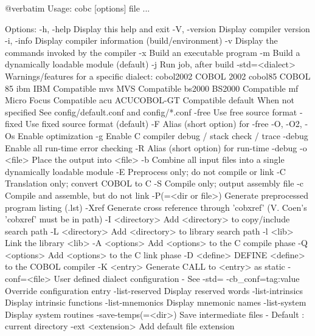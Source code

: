 @verbatim
Usage: cobc [options] file ...

Options:
  -h, -help             Display this help and exit
  -V, -version          Display compiler version
  -i, -info             Display compiler information (build/environment)
  -v                    Display the commands invoked by the compiler
  -x                    Build an executable program
  -m                    Build a dynamically loadable module (default)
  -j                    Run job, after build
  -std=<dialect>        Warnings/features for a specific dialect:
                          cobol2002   COBOL 2002
                          cobol85     COBOL 85
                          ibm         IBM Compatible
                          mvs         MVS Compatible
                          bs2000      BS2000 Compatible
                          mf          Micro Focus Compatible
                          acu         ACUCOBOL-GT Compatible
                          default     When not specified
                        See config/default.conf and config/*.conf
  -free                 Use free source format
  -fixed                Use fixed source format (default)
  -F                    Alias (short option) for -free
  -O, -O2, -Os          Enable optimization
  -g                    Enable C compiler debug / stack check / trace
  -debug                Enable all run-time error checking
  -R                    Alias (short option) for run-time -debug
  -o <file>             Place the output into <file>
  -b                    Combine all input files into a single
                        dynamically loadable module
  -E                    Preprocess only; do not compile or link
  -C                    Translation only; convert COBOL to C
  -S                    Compile only; output assembly file
  -c                    Compile and assemble, but do not link
  -P(=<dir or file>)    Generate preprocessed program listing (.lst)
  -Xref                 Generate cross reference through 'cobxref'
                        (V. Coen's 'cobxref' must be in path)
  -I <directory>        Add <directory> to copy/include search path
  -L <directory>        Add <directory> to library search path
  -l <lib>              Link the library <lib>
  -A <options>          Add <options> to the C compile phase
  -Q <options>          Add <options> to the C link phase
  -D <define>           DEFINE <define> to the COBOL compiler
  -K <entry>            Generate CALL to <entry> as static
  -conf=<file>          User defined dialect configuration - See -std=
  -cb_conf=tag:value    Override configuration entry
  -list-reserved        Display reserved words
  -list-intrinsics      Display intrinsic functions
  -list-mnemonics       Display mnemonic names
  -list-system          Display system routines
  -save-temps(=<dir>)   Save intermediate files
                        - Default : current directory
  -ext <extension>      Add default file extension

